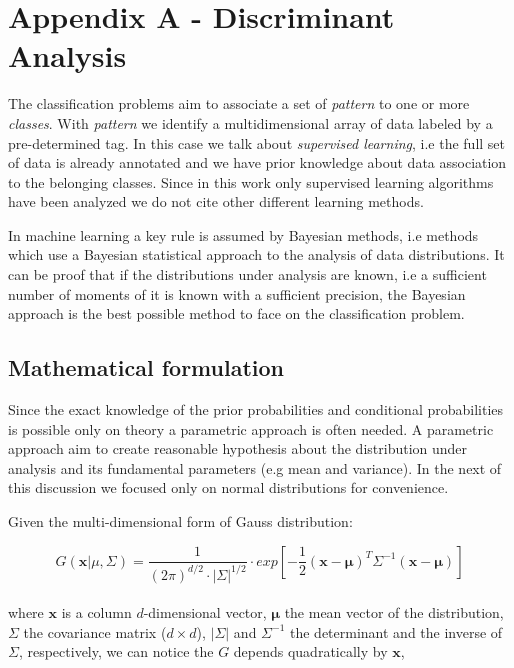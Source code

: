 \documentclass{standalone}
\begin{document}
\chapter*{Appendix A - Discriminant Analysis}

The classification problems aim to associate a set of \emph{pattern} to one or more \emph{classes}.
With \emph{pattern} we identify a multidimensional array of data labeled by a pre-determined tag.
In this case we talk about \emph{supervised learning}, i.e the full set of data is already annotated and we have prior knowledge about data association to the belonging classes.
Since in this work only supervised learning algorithms have been analyzed we do not cite other different learning methods.

In machine learning a key rule is assumed by Bayesian methods, i.e methods which use a Bayesian statistical approach to the analysis of data distributions.
It can be proof that if the distributions under analysis are known, i.e a sufficient number of moments of it is known with a sufficient precision, the Bayesian approach is the best possible method to face on the classification problem. %





\section*{Mathematical formulation}

Since the exact knowledge of the prior probabilities and conditional probabilities is possible only on theory a parametric approach is often needed.
A parametric approach aim to create reasonable hypothesis about the distribution under analysis and its fundamental parameters (e.g mean and variance).
In the next of this discussion we focused only on normal distributions for convenience.

Given the multi-dimensional form of Gauss distribution:

$$
G(\mathbf{x}|\mu, \Sigma) = \frac{1}{(2\pi)^{d/2}\cdot\left|\Sigma\right|^{1/2}}\cdot exp\left[-\frac{1}{2}(\mathbf{x}-\mathbf{\mu})^T\Sigma^{-1}(\mathbf{x}-\mathbf{\mu})\right]
$$
\\
where $\mathbf{x}$ is a column $d$-dimensional vector, $\mathbf{\mu}$ the mean vector of the distribution, $\Sigma$ the covariance matrix ($d\times d$), $|\Sigma|$ and $\Sigma^{-1}$ the determinant and the inverse of $\Sigma$, respectively, we can notice the $G$ depends quadratically by $\mathbf{x}$,
\end{document}
